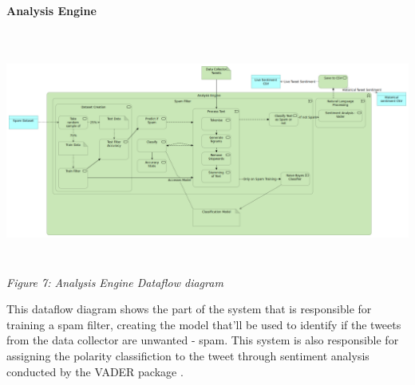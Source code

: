 \documentclass[oneside, 10pt]{article}
\begin{document}
		\textbf{Analysis Engine}
		\begin{center}
			\includegraphics[width=17cm,height=8cm]{images/Analysis_Engine.png}
			\textit{Figure 7: Analysis Engine Dataflow diagram}
		\end{center}
		This dataflow diagram shows the part of the system that is responsible for training a spam filter, creating the model that'll be used to identify if the tweets from the data collector are unwanted - spam. This system is also responsible for assigning the polarity classifiction to the tweet through sentiment analysis conducted by the VADER package \cite{12}.
\end{document}
